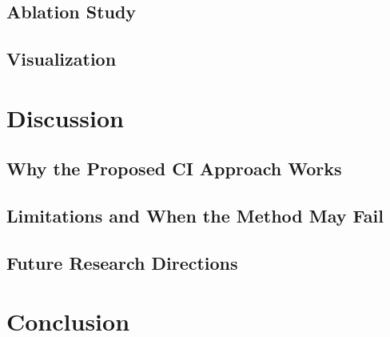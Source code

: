 \documentclass[journal,onecolumn,draftcls]{IEEEtran}
\begin{document}
\subsection{Ablation Study}
\label{sec:exp-ablation}


\subsection{Visualization}
\label{sec:exp-visual}


\section{Discussion}
\label{sec:discussion}

\subsection{Why the Proposed CI Approach Works}
\label{sec:discuss-why}

\subsection{Limitations and When the Method May Fail}
\label{sec:discuss-limitations}

\subsection{Future Research Directions}
\label{sec:discuss-future}

\section{Conclusion}
\label{sec:conclusion}

\end{document}
